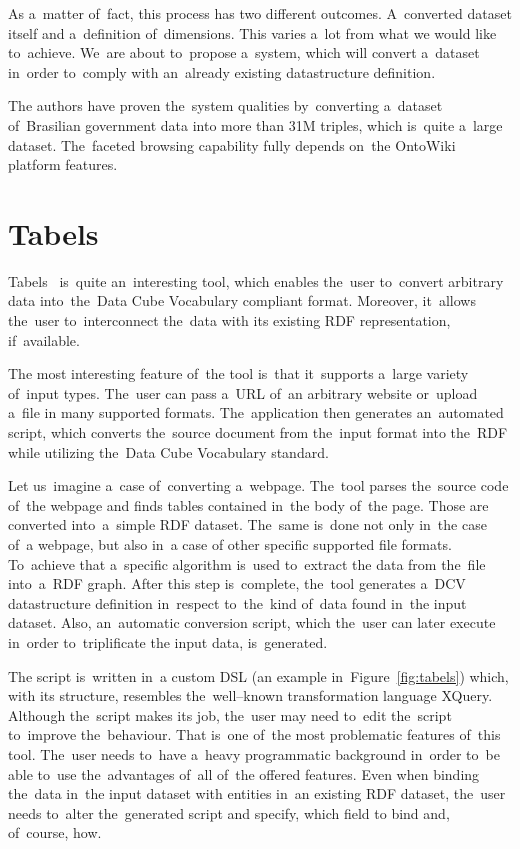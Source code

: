As a~matter of~fact, this process has two different outcomes. A~converted 
dataset itself and a~definition of~dimensions. This varies a~lot from what 
we would like to~achieve. We~are about to~propose a~system, which will convert a~dataset in~order to~comply with an~already existing datastructure definition.

The authors have proven the~system qualities by~converting a~dataset of~Brasilian government data
into more than 31M triples, which is~quite a~large dataset. The~faceted browsing
capability fully depends on~the OntoWiki platform features.

\section{Tabels}
\label{rw:tabels}
Tabels~\cite{tabels-web} is~quite an~interesting tool, which enables the~user to~convert arbitrary data into~the~Data Cube Vocabulary compliant format. 
Moreover, it~allows the~user to~interconnect the~data with its existing RDF 
representation, if~available.

The most interesting feature of~the tool is~that it~supports a~large variety of~input types. The~user can pass a~URL of~an arbitrary website or~upload a~file 
in many supported formats. The~application then generates an~automated script, which converts the~source document from the~input format 
into the~RDF while utilizing the~Data Cube Vocabulary standard.

Let us~imagine a~case of~converting a~webpage. The~tool parses the~source code of~the webpage and 
finds tables contained in~the body of~the page. Those are converted into~a~simple
RDF dataset. The~same is~done not only in~the case of~a webpage, but also in~a case
of other specific supported file formats. To~achieve that a~specific algorithm is~used to~extract
the data from the~file into~a~RDF graph. After this step is~complete, the~tool generates a~DCV
datastructure definition in~respect to~the~kind of~data found in~the input dataset.
Also, an~automatic conversion script, which the~user can later execute in~order to~triplificate
the input data, is~generated.

The script is~written in~a custom DSL (an example in~Figure~\ref{fig:tabels}) which,
with its structure, resembles the~well--known
transformation language XQuery. Although the~script makes its job, the~user may need to~edit the~script to~improve the~behaviour. That is~one of~the 
most problematic features of~this tool. The~user needs to~have a~heavy programmatic 
background in~order to~be able to~use the~advantages of~all of~the offered features. 
Even when binding the~data in~the input dataset with entities in~an existing RDF 
dataset, the~user needs to~alter the~generated script and specify, which field 
to bind and, of~course, how.

